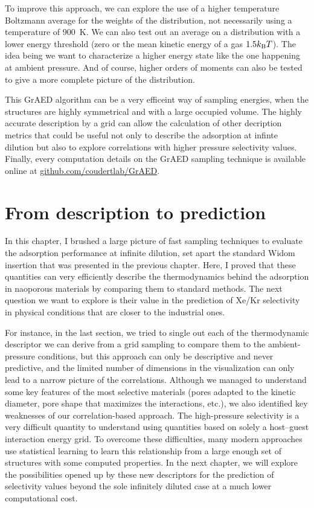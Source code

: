 \documentclass[main]{subfiles}
\begin{document}
To improve this approach, we can explore the use of a higher temperature Boltzmann average for the weights of the distribution, not necessarily using a temperature of \SI{900}{\kelvin}. We can also test out an average on a distribution with a lower energy threshold (zero or the mean kinetic energy of a gas $1.5k_{\text{B}}T$). The idea being we want to characterize a higher energy state like the one happening at ambient pressure. And of course, higher orders of moments can also be tested to give a more complete picture of the distribution.

\vspace{2cm}

This GrAED algorithm can be a very efficeint way of sampling energies, when the structures are highly symmetrical and with a large occupied volume. The highly accurate description by a grid can allow the calculation of other decription metrics that could be useful not only to describe the adsorption at infinte dilution but also to explore correlations with higher pressure selectivity values.
Finally, every computation details on the GrAED sampling technique is available online at \url{github.com/coudertlab/GrAED}.


\section{From description to prediction}

In this chapter, I brushed a large picture of fast sampling techniques to evaluate the adsorption performance at infinite dilution, set apart the standard Widom insertion that was presented in the previous chapter. Here, I proved that these quantities can very efficiently describe the thermodynamics behind the adsorption in naoporous materials by comparing them to standard methods. The next question we want to explore is their value in the prediction of Xe/Kr selectivity in physical conditions that are closer to the industrial ones. 

For instance, in the last section, we tried to single out each of the thermodynamic descriptor we can derive from a grid sampling to compare them to the ambient-pressure conditions, but this approach can only be descriptive and never predictive, and the limited number of dimensions in the visualization can only lead to a narrow picture of the correlations. Although we managed to understand some key features of the most selective materials (pores adapted to the kinetic diameter, pore shape that maximizes the interactions, etc.), we also identified key weaknesses of our correlation-based approach. The high-pressure selectivity is a very difficult quantity to understand using quantities based on solely a host--guest interaction energy grid. To overcome these difficulties, many modern approaches use statistical learning to learn this relationship from a large enough set of structures with some computed properties. In the next chapter, we will explore the possibilities opened up by these new descriptors for the prediction of selectivity values beyond the sole infinitely diluted case at a much lower computational cost.


\OnlyInSubfile{\printglobalbibliography}
\end{document}
